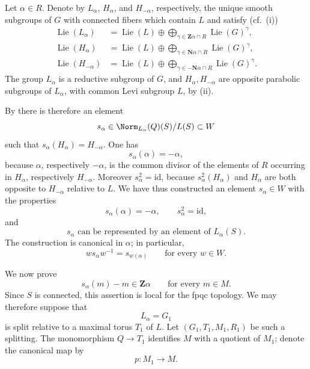 
Let \(\alpha\in R\).  Denote by \(L_\alpha\), \(H_\alpha\), and
\(H_{-\alpha}\), respectively, the unique smooth subgroups of \(G\)
with connected fibers which contain \(L\) and satisfy
\textup{(cf.\ \textup{(i)})}
\[
\begin{aligned}
 \operatorname{Lie}(L_\alpha)
  &=\operatorname{Lie}(L)
    \oplus\bigoplus_{\gamma\in\mathbf Z\alpha\cap R}
       \operatorname{Lie}(G)^\gamma,\\
 \operatorname{Lie}(H_\alpha)
  &=\operatorname{Lie}(L)
    \oplus\bigoplus_{\gamma\in\mathbf N\alpha\cap R}
       \operatorname{Lie}(G)^\gamma,\\
 \operatorname{Lie}(H_{-\alpha})
  &=\operatorname{Lie}(L)
    \oplus\bigoplus_{\gamma\in-\mathbf N\alpha\cap R}
       \operatorname{Lie}(G)^\gamma.
\end{aligned}
\]
The group \(L_\alpha\) is a reductive subgroup of \(G\), and
\(H_\alpha,H_{-\alpha}\) are opposite parabolic subgroups of
\(L_\alpha\), with common Levi subgroup \(L\), by
\textup{(ii)}.

By  there is therefore an element
\[
 s_\alpha\in\Norm_{L_\alpha}(Q)(S)/L(S)\subset W
\]
such that \(s_\alpha(H_\alpha)=H_{-\alpha}\).  One has
\[
 s_\alpha(\alpha)=-\alpha,
\]
because \(\alpha\), respectively \(-\alpha\), is the common divisor
of the elements of \(R\) occurring in \(H_\alpha\), respectively
\(H_{-\alpha}\).  Moreover \(s_\alpha^2=\mathrm{id}\), because
\(s_\alpha^2(H_\alpha)\) and \(H_\alpha\) are both opposite to
\(H_{-\alpha}\) relative to \(L\).  We have thus constructed an
element \(s_\alpha\in W\) with the properties
\[
\tag{x}\label{sga3:xxvi:subsection:7-4-2:equation:x}
 s_\alpha(\alpha)=-\alpha,\qquad s_\alpha^2=\mathrm{id},
\]
and
\[
\tag{xx}\label{sga3:xxvi:subsection:7-4-2:equation:xx}
 s_\alpha\text{ can be represented by an element of }L_\alpha(S).
\]
The construction is canonical in \(\alpha\); in particular,
\[
\tag{xxx}\label{sga3:xxvi:subsection:7-4-2:equation:xxx}
 w s_\alpha w^{-1}=s_{w(\alpha)}
 \qquad\text{for every }w\in W.
\]


We now prove
\[
\tag{xxxx}\label{sga3:xxvi:subsection:7-4-3:equation:xxxx}
 s_\alpha(m)-m\in\mathbf Z\alpha
 \qquad\text{for every }m\in M.
\]
Since \(S\) is connected, this assertion is local for the fpqc
topology.  We may therefore suppose that
\[
 L_\alpha=G_1
\]
is split relative to a maximal torus \(T_1\) of \(L\).  Let
\((G_1,T_1,M_1,R_1)\) be such a splitting.  The monomorphism
\(Q\to T_1\) identifies \(M\) with a quotient of \(M_1\); denote the
canonical map by
\[
 p:M_1\longrightarrow M.
\]

